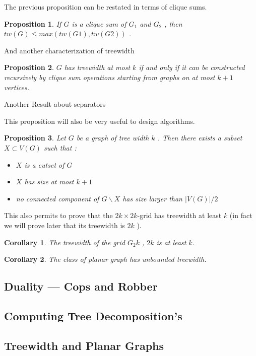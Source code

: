 \documentclass[12pt,a4paper]{article}
\newtheorem{prop}{Proposition}
\newtheorem{corollary}{Corollary}
\begin{document}
The previous proposition can be restated in terms of clique sums.

\begin{prop}
If $G$ is a clique sum of $G_1$ and $G_2$ , then $tw( G ) \leq max(tw( G 1 ), tw( G 2 ))$ .
\end{prop}

And another characterization of treewidth

\begin{prop}
$G$ has treewidth at most $k$ if and only if it can be constructed recursively by clique
sum operations starting from graphs on at most $k + 1$ vertices.
\end{prop}

Another Result about separators

This proposition will also be very useful to design algorithms.
\begin{prop}
Let $G$ be a graph of tree width $k$ . Then there exists a subset $X \subset V ( G )$ such that :
\begin{itemize}
\item $X$ is a cutset of $G$
\item $X$ has size at most $k + 1$
\item no connected component of $G \backslash X$ has size larger than $| V ( G )|/ 2$
\end{itemize}
\end{prop}

This also permits to prove that the $2k \times 2k$-grid has treewidth at least $k$ (in fact we
will prove later that its treewidth is $2k$ ).

\begin{corollary}
The treewidth of the grid $G_2k$ , $2k$ is at least $k$.
\end{corollary}

\begin{corollary}
The class of planar graph has unbounded treewidth.
\end{corollary}


\subsection{Duality --- Cops and Robber}
\subsection{Computing Tree Decomposition's}
\subsection{Treewidth and Planar Graphs}
\end{document}
